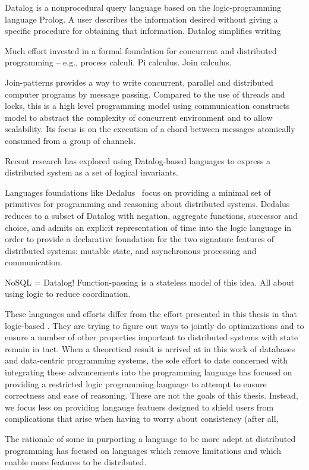 Datalog is a nonprocedural query language based on the logic-programming
language Prolog.  A user describes the information desired without giving a
specific procedure for obtaining that information. Datalog simplifies writing

Much effort invested in a formal foundation for concurrent and distributed
programming -- e.g., process calculi. Pi calculus. Join calculus.

Join-patterns provides a way to write concurrent, parallel and distributed
computer programs by message passing. Compared to the use of threads and locks,
this is a high level programming model using communication constructs model to
abstract the complexity of concurrent environment and to allow scalability. Its
focus is on the execution of a chord between messages atomically consumed from a
group of channels.

Recent research has explored using Datalog-based languages to express a
distributed system as a set of logical invariants.

Languages foundations like Dedalus~\cite{Dedalus} focus on providing a minimal set of
primitives for programming and reasoning about distributed systems. Dedalus
reduces to a subset of Datalog with negation, aggregate functions,
successor and choice, and admits an explicit representation of time into the
logic language in order to provide a declarative foundation for the two
signature features of distributed systems: mutable state, and asynchronous
processing and communication.

NoSQL = Datalog! Function-passing is a stateless model of this idea. All about
using logic to reduce coordination.

These languages and efforts differ from the effort presented in this thesis in
that logic-based . They are trying to figure out ways to jointly do
optimizations and to ensure a number of other properties important to
distributed systems with state remain in tact. When a theoretical result is
arrived at in this work of databases and data-centric programming systems, the
sole effort to date concerned with integrating these advancements into the
programming language has focused on providing a restricted logic programming
language to attempt to ensure correctness and ease of reasoning. These are not
the goals of this thesis. Instead, we focus less on providing langauge featuers designed to shield users from complications that arise when having to worry about consistency (after all,


The rationale of some in purporting a language to be more adept at distributed
programming has focused on languages which remove limitations and which enable
more features to be distributed.

